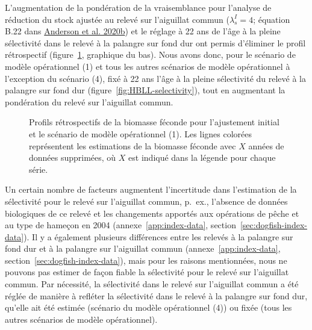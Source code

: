 \documentclass[french,11pt]{book}
\begin{document}
L'augmentation de la pondération de la vraisemblance pour l'analyse de réduction du stock ajustée au relevé sur l'aiguillat commun (\(\lambda^I_s = 4\); équation B.22 dans \protect\hyperlink{ref-anderson2020gfmp}{Anderson et al. 2020b}) et le réglage à 22 ans de l'âge à la pleine sélectivité dans le relevé à la palangre sur fond dur ont permis d'éliminer le profil rétrospectif (figure~\ref{fig:retro-initial}, graphique du bas). Nous avons donc, pour le scénario de modèle opérationnel (1) et tous les autres scénarios de modèle opérationnel à l'exception du scénario (4), fixé à 22 ans l'âge à la pleine sélectivité du relevé à la palangre sur fond dur (figure~\ref{fig:HBLL-selectivity}), tout en augmentant la pondération du relevé sur l'aiguillat commun.


\begin{figure}[htb]

{\centering {} 

}

\caption{Profils rétrospectifs de la biomasse féconde pour l'ajustement initial et le scénario de modèle opérationnel (1). Les lignes colorées représentent les estimations de la biomasse féconde avec \(X\) années de données supprimées, où \(X\) est indiqué dans la légende pour chaque série.}\label{fig:retro-initial}
\end{figure}
Un certain nombre de facteurs augmentent l'incertitude dans l'estimation de la sélectivité pour le relevé sur l'aiguillat commun, p.~ex., l'absence de données biologiques de ce relevé et les changements apportés aux opérations de pêche et au type de hameçon en 2004 (annexe~\ref{app:index-data}, section~\ref{sec:dogfish-index-data}). Il y a également plusieurs différences entre les relevés à la palangre sur fond dur et à la palangre sur l'aiguillat commun (annexe~\ref{app:index-data}, section~\ref{sec:dogfish-index-data}), mais pour les raisons mentionnées, nous ne pouvons pas estimer de façon fiable la sélectivité pour le relevé sur l'aiguillat commun. Par nécessité, la sélectivité dans le relevé sur l'aiguillat commun a été réglée de manière à refléter la sélectivité dans le relevé à la palangre sur fond dur, qu'elle ait été estimée (scénario du modèle opérationnel (4)) ou fixée (tous les autres scénarios de modèle opérationnel).
\end{document}
